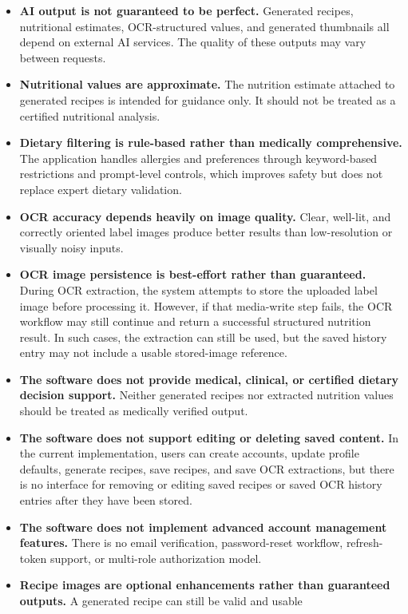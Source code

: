 \begin{itemize}
	\item \textbf{AI output is not guaranteed to be perfect.} Generated
	recipes, nutritional estimates, OCR-structured values, and
	generated thumbnails all depend on external AI services. The quality
	of these outputs may vary between requests.
	\item \textbf{Nutritional values are approximate.} The nutrition
	estimate attached to generated recipes is intended for guidance only.
	It should not be treated as a certified nutritional analysis.
	\item \textbf{Dietary filtering is rule-based rather than
	medically comprehensive.} The application handles allergies and
	preferences through keyword-based restrictions and prompt-level
	controls, which improves safety but does not replace expert dietary
	validation.
	\item \textbf{OCR accuracy depends heavily on image quality.} Clear,
	well-lit, and correctly oriented label images produce better
	results than low-resolution or visually noisy inputs.
	\item \textbf{OCR image persistence is best-effort rather than
	guaranteed.} During OCR extraction, the system attempts to store the
	uploaded label image before processing it. However, if that media-write
	step fails, the OCR workflow may still continue and return a
	successful structured nutrition result. In such cases, the extraction
	can still be used, but the saved history entry may not include a
	usable stored-image reference.
	\item \textbf{The software does not provide medical, clinical, or
	certified dietary decision support.} Neither generated recipes nor
	extracted nutrition values should be treated as medically verified
	output.
	\item \textbf{The software does not support editing or deleting saved
	content.} In the current implementation, users can create accounts,
	update profile defaults, generate recipes, save recipes, and save OCR
	extractions, but there is no interface for removing or editing saved
	recipes or saved OCR history entries after they have been stored.
	\item \textbf{The software does not implement advanced account
	management features.} There is no email verification, password-reset
	workflow, refresh-token support, or multi-role authorization model.
	\item \textbf{Recipe images are optional enhancements rather than
	guaranteed outputs.} A generated recipe can still be valid and usable

\end{itemize}
